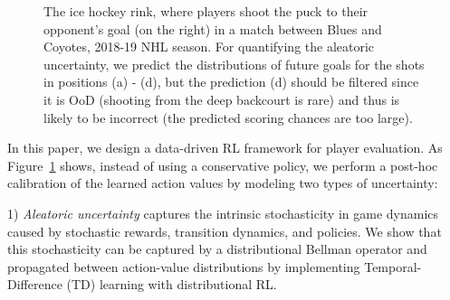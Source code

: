 \documentclass{article}
\begin{document}
\begin{figure}
    \vspace{-0.25in}
    \caption{The ice hockey rink, where players shoot the puck to their opponent's goal (on the right) in a match between Blues and Coyotes, 2018-19 NHL season. For quantifying the aleatoric uncertainty, we predict the distributions of future goals for the shots in positions (a) - (d), but the prediction (d) should be filtered since it is OoD (shooting from the deep backcourt is rare) and thus is likely to be incorrect (the predicted scoring chances are too large).}
    \label{fig:examples-distribution-ice-hockey}
    \vspace{-0.15in}
\end{figure}

In this paper, we design a data-driven RL framework for player evaluation. As Figure~\ref{fig:examples-distribution-ice-hockey} shows, instead of using a  conservative policy, we perform a post-hoc calibration of the learned action values by modeling two types of uncertainty:

1) {\it Aleatoric uncertainty} captures the intrinsic stochasticity in game dynamics caused by stochastic rewards, transition dynamics, and policies. We show that this stochasticity can be captured by a distributional Bellman operator and propagated between action-value distributions by implementing Temporal-Difference (TD) learning with distributional RL.
  
\end{document}
